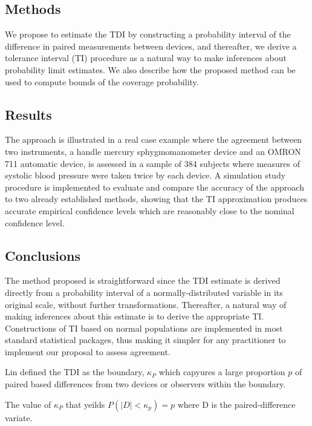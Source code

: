 \documentclass[12pt, a4paper]{report}
\theoremstyle{plain}
\theoremstyle{definition}
\theoremstyle{remark}
\begin{document}
\subsection{Methods}
We propose to estimate the TDI by constructing a probability interval of the difference in paired measurements between devices, and thereafter, we derive a tolerance interval (TI) procedure as a natural way to make inferences about probability limit estimates. We also describe how the proposed method can be used to compute bounds of the coverage probability.

\subsection{Results}
The approach is illustrated in a real case example where the agreement between two instruments, a handle mercury sphygmomanometer device and an OMRON 711 automatic device, is assessed in a sample of 384 subjects where measures of systolic blood pressure were taken twice by each device. A simulation study procedure is implemented to evaluate and compare the accuracy of the approach to two already established methods, showing that the TI approximation produces accurate empirical confidence levels which are reasonably close to the nominal confidence level.

\subsection{Conclusions}
The method proposed is straightforward since the TDI estimate is derived directly from a probability interval of a normally-distributed variable in its original scale, without further transformations. Thereafter, a natural way of making inferences about this estimate is to derive the appropriate TI. Constructions of TI based on normal populations are implemented in most standard statistical packages, thus making it simpler for any practitioner to implement our proposal to assess agreement.

Lin defined the TDI as the boundary, $\kappa_P$ which capyures a large proportion $p$ of paired based differences from 
two devices or observers within the boundary.

The value of $\kappa_P$ that yeilds $P(|D| <\kappa_p) = p$ where D is the paired-difference variate.

\end{document}
